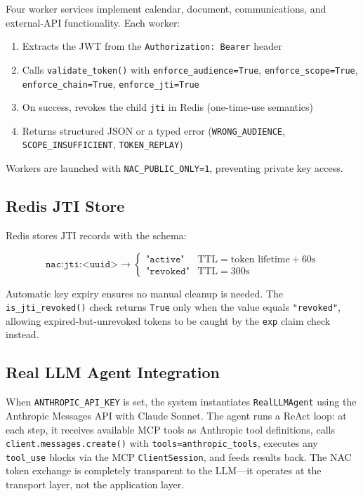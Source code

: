 \documentclass[journal]{IEEEtran}
\begin{document}
Four worker services implement calendar, document, communications, and external-API functionality. Each worker:

\begin{enumerate}
  \item Extracts the JWT from the \texttt{Authorization: Bearer} header
  \item Calls \texttt{validate\_token()} with \texttt{enforce\_audience=True}, \texttt{enforce\_scope=True}, \texttt{enforce\_chain=True}, \texttt{enforce\_jti=True}
  \item On success, revokes the child \texttt{jti} in Redis (one-time-use semantics)
  \item Returns structured JSON or a typed error (\texttt{WRONG\_AUDIENCE}, \texttt{SCOPE\_INSUFFICIENT}, \texttt{TOKEN\_REPLAY})
\end{enumerate}

Workers are launched with \texttt{NAC\_PUBLIC\_ONLY=1}, preventing private key access.

\subsection{Redis JTI Store}

Redis stores JTI records with the schema:

\begin{equation}
\texttt{nac:jti:<uuid>} \to \begin{cases}
  \texttt{"active"} & \text{TTL} = \text{token lifetime} + 60\text{s} \\
  \texttt{"revoked"} & \text{TTL} = 300\text{s}
\end{cases}
\end{equation}

Automatic key expiry ensures no manual cleanup is needed. The \texttt{is\_jti\_revoked()} check returns \texttt{True} only when the value equals \texttt{"revoked"}, allowing expired-but-unrevoked tokens to be caught by the \texttt{exp} claim check instead.

\subsection{Real LLM Agent Integration}

When \texttt{ANTHROPIC\_API\_KEY} is set, the system instantiates \texttt{RealLLMAgent} using the Anthropic Messages API with Claude Sonnet. The agent runs a ReAct loop: at each step, it receives available MCP tools as Anthropic tool definitions, calls \texttt{client.messages.create()} with \texttt{tools=anthropic\_tools}, executes any \texttt{tool\_use} blocks via the MCP \texttt{ClientSession}, and feeds results back. The NAC token exchange is completely transparent to the LLM---it operates at the transport layer, not the application layer.
\end{document}
